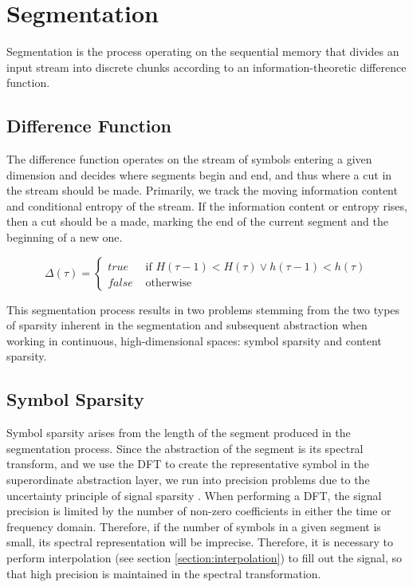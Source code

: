\section{Segmentation}
\label{section:segmentation}

Segmentation is the process operating on the sequential memory that divides an input stream into discrete chunks according to an information-theoretic difference function. \citep{wiggins2019learning}

\subsection{Difference Function}
\label{section:difference-function}

The difference function operates on the stream of symbols entering a given dimension and decides where segments begin and end, and thus where a cut in the stream should be made. Primarily, we track the moving information content and conditional entropy of the stream.  If the information content or entropy rises, then a cut should be a made, marking the end of the current segment and the beginning of a new one.

\begin{equation}
  \Delta(\tau) = \begin{cases}
    true & \text{ if } H(\tau-1) < H(\tau) \lor h(\tau-1) < h(\tau) \\
    false & \text{ otherwise }
  \end{cases}
\end{equation}

This segmentation process results in two problems stemming from the two types of sparsity inherent in the segmentation and subsequent abstraction when working in continuous, high-dimensional spaces: symbol sparsity and content sparsity.

\subsection{Symbol Sparsity}
\label{section:symbol-sparsity}

Symbol sparsity arises from the length of the segment produced in the segmentation process.  Since the abstraction of the segment is its spectral transform, and we use the DFT to create the representative symbol in the superordinate abstraction layer, we run into precision problems due to the uncertainty principle of signal sparsity \citep{robertson1929uncertainty}.  When performing a DFT, the signal precision is limited by the number of non-zero coefficients in either the time or frequency domain.  Therefore, if the number of symbols in a given segment is small, its spectral representation will be imprecise.  Therefore, it is necessary to perform interpolation (see section \ref{section:interpolation}) to fill out the signal, so that high precision is maintained in the spectral transformation.

